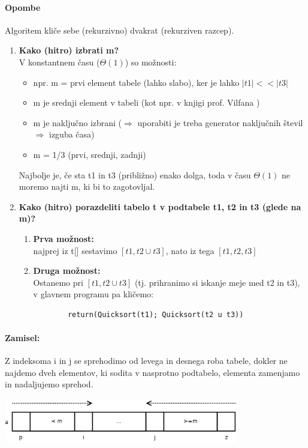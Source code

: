 \documentclass[a4paper,10pt]{article}
\begin{document}
\paragraph{Opombe}
Algoritem kli\v ce sebe (rekurzivno) dvakrat (rekurziven razcep).
\begin{enumerate}
\item \textbf{Kako (hitro) izbrati m?}\\
V konstantnem \v casu ($\Theta (1)$) so mo\v znosti:
\begin{itemize}
	\item npr. m = prvi element tabele (lahko slabo), ker je lahko $|t1|<<|t3|$
	\item m je srednji element v tabeli (kot npr. v knjigi prof. Vilfana \cite{vilfan02})
	\item m je naklju\v cno izbrani ($\Rightarrow$ uporabiti je treba generator naklju\v cnih \v stevil $\Rightarrow$ izguba \v casa)
	\item m = 1/3 (prvi, srednji, zadnji)
\end{itemize}
Najbolje je, \v ce sta t1 in t3 (pribli\v zno) enako dolga, toda v \v casu $\Theta (1)$ ne moremo najti m, ki bi to zagotovljal.
\item \textbf{Kako (hitro) porazdeliti tabelo t v podtabele t1, t2 in t3 (glede na m)?} \\
	\begin{enumerate}
	\item \textbf{Prva mo\v znost:} \\
		najprej iz t[] sestavimo $[t1, t2 \cup t3]$, nato iz tega $[t1, t2, t3]$
	\item \textbf{Druga mo\v znost:} \\
		Ostanemo pri $[t1, t2 \cup t3]$ (tj. prihranimo si iskanje meje med t2 in t3), v glavnem programu pa kli\v cemo:
		\begin{verbatim}
		return(Quicksort(t1); Quicksort(t2 u t3))
		\end{verbatim}
	\end{enumerate}
\end{enumerate}

\paragraph{Zamisel:}
Z indeksoma i in j se sprehodimo od levega in desnega roba tabele, dokler ne najdemo dveh elementov, ki sodita v nasprotno podtabelo, elementa zamenjamo in nadaljujemo sprehod.

\begin{center}
	\includegraphics[width=10.2cm,height=1.95cm]{Slike/QuickSortTabela2.png}
\end{center}
\end{document}
